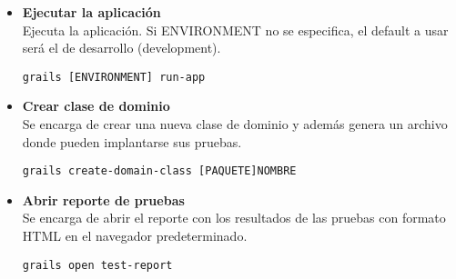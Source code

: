 \begin{itemize}
    \item \textbf{Ejecutar la aplicaci\'on}
        \\Ejecuta la aplicaci\'on. Si ENVIRONMENT no se especifica, el default a usar ser\'a el de desarrollo (development).
        \begin{lstlisting}[gobble=11]
            grails [ENVIRONMENT] run-app
        \end{lstlisting}
        
        
    \item \textbf{Crear clase de dominio}
        \\Se encarga de crear una nueva clase de dominio y adem\'as genera un archivo donde pueden implantarse sus pruebas.
        \begin{lstlisting}[gobble=11]
            grails create-domain-class [PAQUETE]NOMBRE
        \end{lstlisting}        
        
    \item \textbf{Abrir reporte de pruebas}
        \\Se encarga de abrir el reporte con los resultados de las pruebas con formato HTML en el navegador predeterminado.
        \begin{lstlisting}[gobble=11]
            grails open test-report
        \end{lstlisting}            
\end{itemize}
